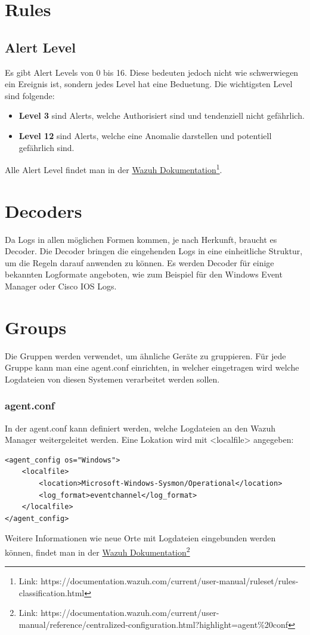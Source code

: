 \section{Rules}
\subsection{Alert Level}
Es gibt Alert Levels von 0 bis 16. 
Diese bedeuten jedoch nicht wie schwerwiegen ein Ereignis ist, sondern jedes Level hat eine Beduetung.
Die wichtigsten Level sind folgende:
\begin{itemize}
    \item \textbf{Level 3} sind Alerts, welche Authorisiert sind und tendenziell nicht gefährlich.
    \item \textbf{Level 12} sind Alerts, welche eine Anomalie darstellen und potentiell gefährlich sind.
\end{itemize}

Alle Alert Level findet man in der \href{https://documentation.wazuh.com/current/user-manual/ruleset/rules-classification.html}{Wazuh Dokumentation}\footnote{Link: https://documentation.wazuh.com/current/user-manual/ruleset/rules-classification.html}.

\section{Decoders}
Da Logs in allen möglichen Formen kommen, je nach Herkunft, braucht es Decoder.
Die Decoder bringen die eingehenden Logs in eine einheitliche Struktur, um die Regeln darauf anwenden zu können.
Es werden Decoder für einige bekannten Logformate angeboten, wie zum Beispiel für den Windows Event Manager oder Cisco IOS Logs.


\section{Groups}
Die Gruppen werden verwendet, um ähnliche Geräte zu gruppieren.
Für jede Gruppe kann man eine agent.conf einrichten, in welcher eingetragen wird welche Logdateien von diesen Systemen verarbeitet werden sollen. 

\subsubsection{agent.conf}
In der agent.conf kann definiert werden, welche Logdateien an den Wazuh Manager weitergeleitet werden. 
Eine Lokation wird mit <localfile> angegeben:
\begin{lstlisting}
<agent_config os="Windows">
	<localfile>
		<location>Microsoft-Windows-Sysmon/Operational</location>
		<log_format>eventchannel</log_format>
	</localfile>
</agent_config>
\end{lstlisting}
Weitere Informationen wie neue Orte mit Logdateien eingebunden werden können, findet man in der \href{https://documentation.wazuh.com/current/user-manual/reference/centralized-configuration.html?highlight=agent%20conf}{Wazuh Dokumentation}\footnote{Link: https://documentation.wazuh.com/current/user-manual/reference/centralized-configuration.html?highlight=agent\%20conf}